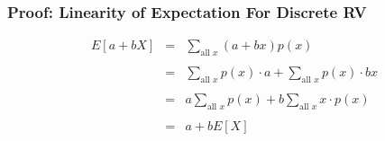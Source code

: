 \documentclass[handout]{beamer}
\begin{document}
\begin{frame}
\frametitle{Proof: Linearity of Expectation For Discrete RV}

\begin{eqnarray*}
	E[a + bX] &=& \sum_{\mbox{all } x}  (a + bx) p(x)\\ \\
	 &=&  \sum_{\mbox{all } x} p(x) \cdot a + \sum_{\mbox{all } x}p(x) \cdot bx\\ \\
	&=&  a\sum_{\mbox{all } x} p(x) + b\sum_{\mbox{all } x} x \cdot p(x) \\ \\
	&=&  a + b E[X]
\end{eqnarray*}


\end{frame}
\end{document}
